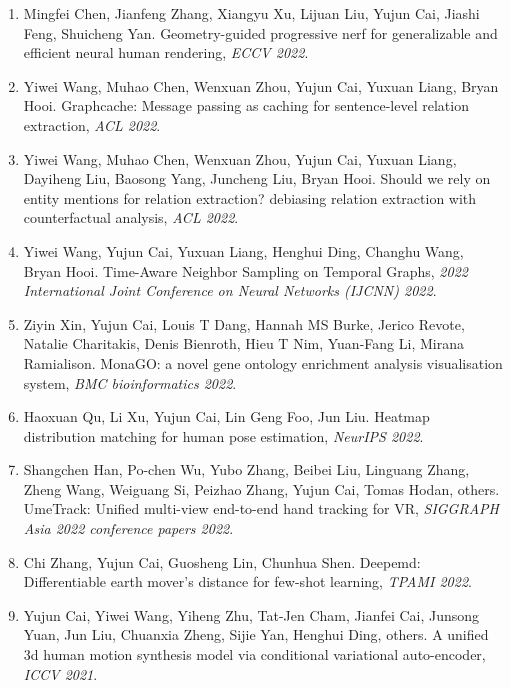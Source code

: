 \begin{enumerate}
\item Mingfei Chen, Jianfeng Zhang, Xiangyu Xu, Lijuan Liu, Yujun Cai, Jiashi Feng, Shuicheng Yan. Geometry-guided progressive nerf for generalizable and efficient neural human rendering, \textit{ECCV 2022}.

\item Yiwei Wang, Muhao Chen, Wenxuan Zhou, Yujun Cai, Yuxuan Liang, Bryan Hooi. Graphcache: Message passing as caching for sentence-level relation extraction, \textit{ACL 2022}.

\item Yiwei Wang, Muhao Chen, Wenxuan Zhou, Yujun Cai, Yuxuan Liang, Dayiheng Liu, Baosong Yang, Juncheng Liu, Bryan Hooi. Should we rely on entity mentions for relation extraction? debiasing relation extraction with counterfactual analysis, \textit{ACL 2022}.

\item Yiwei Wang, Yujun Cai, Yuxuan Liang, Henghui Ding, Changhu Wang, Bryan Hooi. Time-Aware Neighbor Sampling on Temporal Graphs, \textit{2022 International Joint Conference on Neural Networks (IJCNN) 2022}.

\item Ziyin Xin, Yujun Cai, Louis T Dang, Hannah MS Burke, Jerico Revote, Natalie Charitakis, Denis Bienroth, Hieu T Nim, Yuan-Fang Li, Mirana Ramialison. MonaGO: a novel gene ontology enrichment analysis visualisation system, \textit{BMC bioinformatics 2022}.

\item Haoxuan Qu, Li Xu, Yujun Cai, Lin Geng Foo, Jun Liu. Heatmap distribution matching for human pose estimation, \textit{NeurIPS 2022}.

\item Shangchen Han, Po-chen Wu, Yubo Zhang, Beibei Liu, Linguang Zhang, Zheng Wang, Weiguang Si, Peizhao Zhang, Yujun Cai, Tomas Hodan, others. UmeTrack: Unified multi-view end-to-end hand tracking for VR, \textit{SIGGRAPH Asia 2022 conference papers 2022}.

\item Chi Zhang, Yujun Cai, Guosheng Lin, Chunhua Shen. Deepemd: Differentiable earth mover's distance for few-shot learning, \textit{TPAMI 2022}.

\item Yujun Cai, Yiwei Wang, Yiheng Zhu, Tat-Jen Cham, Jianfei Cai, Junsong Yuan, Jun Liu, Chuanxia Zheng, Sijie Yan, Henghui Ding, others. A unified 3d human motion synthesis model via conditional variational auto-encoder, \textit{ICCV 2021}.


\end{enumerate}
